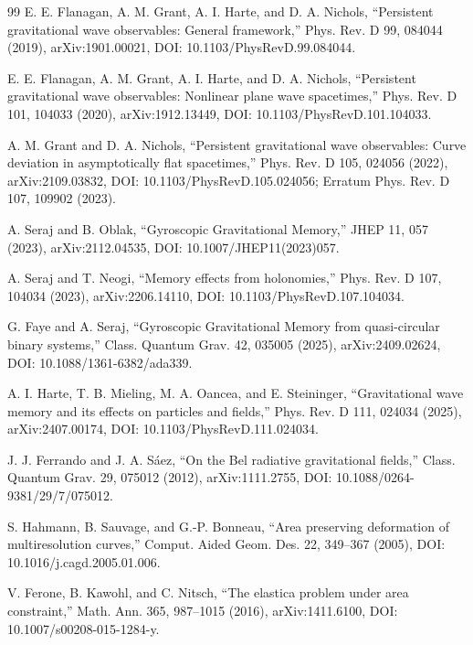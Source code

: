 \begin{thebibliography}{99}
E. E. Flanagan, A. M. Grant, A. I. Harte, and D. A. Nichols,
``Persistent gravitational wave observables: General framework,''
Phys. Rev. D 99, 084044 (2019), arXiv:1901.00021, DOI: 10.1103/PhysRevD.99.084044.

E. E. Flanagan, A. M. Grant, A. I. Harte, and D. A. Nichols,
``Persistent gravitational wave observables: Nonlinear plane wave spacetimes,''
Phys. Rev. D 101, 104033 (2020), arXiv:1912.13449, DOI: 10.1103/PhysRevD.101.104033.

A. M. Grant and D. A. Nichols,
``Persistent gravitational wave observables: Curve deviation in asymptotically flat spacetimes,''
Phys. Rev. D 105, 024056 (2022), arXiv:2109.03832, DOI: 10.1103/PhysRevD.105.024056; Erratum Phys. Rev. D 107, 109902 (2023).

A. Seraj and B. Oblak,
``Gyroscopic Gravitational Memory,''
JHEP 11, 057 (2023), arXiv:2112.04535, DOI: 10.1007/JHEP11(2023)057.

A. Seraj and T. Neogi,
``Memory effects from holonomies,''
Phys. Rev. D 107, 104034 (2023), arXiv:2206.14110, DOI: 10.1103/PhysRevD.107.104034.

G. Faye and A. Seraj,
``Gyroscopic Gravitational Memory from quasi-circular binary systems,''
Class. Quantum Grav. 42, 035005 (2025), arXiv:2409.02624, DOI: 10.1088/1361-6382/ada339.

A. I. Harte, T. B. Mieling, M. A. Oancea, and E. Steininger,
``Gravitational wave memory and its effects on particles and fields,''
Phys. Rev. D 111, 024034 (2025), arXiv:2407.00174, DOI: 10.1103/PhysRevD.111.024034.

J. J. Ferrando and J. A. S\'aez,
``On the Bel radiative gravitational fields,''
Class. Quantum Grav. 29, 075012 (2012), arXiv:1111.2755, DOI: 10.1088/0264-9381/29/7/075012.

S. Hahmann, B. Sauvage, and G.-P. Bonneau,
``Area preserving deformation of multiresolution curves,''
Comput. Aided Geom. Des. 22, 349--367 (2005), DOI: 10.1016/j.cagd.2005.01.006.

V. Ferone, B. Kawohl, and C. Nitsch,
``The elastica problem under area constraint,''
Math. Ann. 365, 987--1015 (2016), arXiv:1411.6100, DOI: 10.1007/s00208-015-1284-y.
\end{thebibliography}